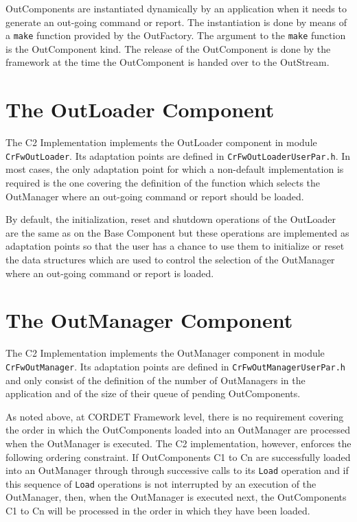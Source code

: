 \documentclass{pnp_article}
\begin{document}
OutComponents are instantiated dynamically by an application when it needs to generate an out-going command or report. The instantiation is done by means of a \texttt{make} function provided by the OutFactory. The argument to the \texttt{make} function is the OutComponent kind. The release of the OutComponent is done by the framework at the time the OutComponent is handed over to the OutStream.

\section{The OutLoader Component}\label{sec:OutLoader}


The C2 Implementation implements the OutLoader component in module \texttt{CrFwOutLoader}. Its adaptation points are defined in \texttt{CrFwOutLoaderUserPar.h}. In most cases, the only adaptation point for which a non-default implementation is required is the one covering the definition of the function which selects the OutManager where an out-going command or report should be loaded. 

By default, the initialization, reset and shutdown operations of the OutLoader are the same as on the Base Component but these operations are implemented as adaptation points so that the user has a chance to use them to initialize or reset the data structures which are used to control the selection of the OutManager where an out-going command or report is loaded.

\section{The OutManager Component}\label{sec:OutManager}


The C2 Implementation implements the OutManager component in module \texttt{CrFwOutManager}. Its adaptation points are defined in \texttt{CrFwOutManagerUserPar.h} and only consist of the definition of the number of OutManagers in the application and of the size of their queue of pending OutComponents. 

As noted above, at CORDET Framework level, there is no requirement covering the order in which the OutComponents loaded into an OutManager are processed when the OutManager is executed. The C2 implementation, however, enforces the following ordering constraint. If OutComponents C1 to Cn are successfully loaded into an OutManager through through successive calls to its \texttt{Load} operation and if this sequence of \texttt{Load} operations is not interrupted by an execution of the OutManager, then, when the OutManager is executed next, the OutComponents C1 to Cn will be processed in the order in which they have been loaded.
\end{document}
